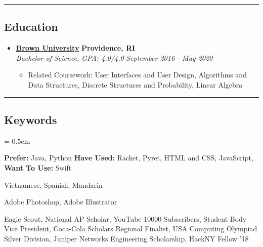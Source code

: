 \documentclass[10pt,letterpaper]{article}
\begin{document}

\hrule
\vspace{-1.0em}
\subsection*{Education}
  \begin{itemize}
    \parskip=-0.5em

    \item[]
    {\href{https://www.brown.edu/}{\textbf{Brown University}} \hfill
      \textbf{Providence, RI}}
    \\
    {\emph{Bachelor of Science, GPA: 4.0/4.0} \hfill
      \emph{September 2016 - May 2020}}

    \begin{itemize}[label=\textbullet]
      \item Related Coursework: User Interfaces and User Design, Algorithms and Data Structures, Discrete Structures and Probability, Linear Algebra
    \end{itemize}
  \end{itemize}

\hrule
\vspace{-1.0em}
\subsection*{Keywords}
\begin{description}[labelindent=\parindent]
  \parskip=-0.5em
\item[Languages:] \textbf{Prefer:} Java, Python \textbf{Have Used:} Racket, Pyret,
  HTML and CSS, JavaScript, \textbf{Want To Use:} Swift
  \item[Human Languages:] Vietnamese, Spanish, Mandarin
  \item[Design:] Adobe Photoshop, Adobe Illustrator
  \item[Accomplishments:] Eagle Scout, National AP Scholar, YouTube 10000 Subscribers, Student Body Vice President, Coca-Cola Scholars Regional Finalist, USA Computing Olympiad Silver Division, Juniper Networks Engineering Scholarship, HackNY Fellow '18
\end{description}
\end{document}
